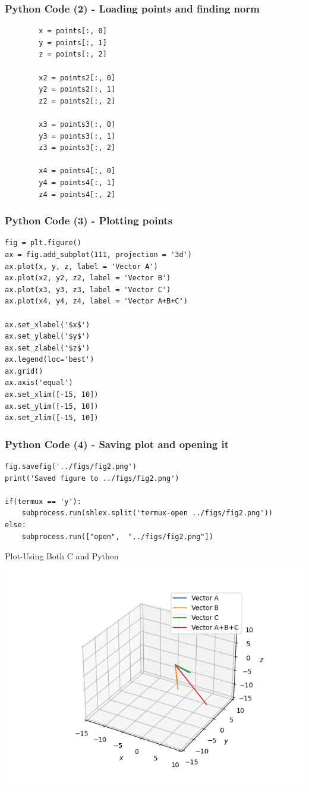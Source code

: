 \documentclass{beamer}
\begin{document}
\begin{frame}[fragile]
    \frametitle{Python Code (2) - Loading points and finding norm}
    \begin{lstlisting}
        x = points[:, 0]
        y = points[:, 1]
        z = points[:, 2]
        
        x2 = points2[:, 0]
        y2 = points2[:, 1]
        z2 = points2[:, 2]
        
        x3 = points3[:, 0]
        y3 = points3[:, 1]
        z3 = points3[:, 2]
        
        x4 = points4[:, 0]
        y4 = points4[:, 1]
        z4 = points4[:, 2]
    \end{lstlisting}
\end{frame}

\begin{frame}[fragile]
    \frametitle{Python Code (3) - Plotting points}
    \begin{lstlisting}
fig = plt.figure()
ax = fig.add_subplot(111, projection = '3d')
ax.plot(x, y, z, label = 'Vector A')
ax.plot(x2, y2, z2, label = 'Vector B')
ax.plot(x3, y3, z3, label = 'Vector C')
ax.plot(x4, y4, z4, label = 'Vector A+B+C')

ax.set_xlabel('$x$')
ax.set_ylabel('$y$')
ax.set_zlabel('$z$')
ax.legend(loc='best')
ax.grid() 
ax.axis('equal')
ax.set_xlim([-15, 10])
ax.set_ylim([-15, 10])
ax.set_zlim([-15, 10])

\end{lstlisting}
\end{frame}

\begin{frame}[fragile]
    \frametitle{Python Code (4) - Saving plot and opening it}
    \begin{lstlisting}
fig.savefig('../figs/fig2.png')
print('Saved figure to ../figs/fig2.png')

if(termux == 'y'):
    subprocess.run(shlex.split('termux-open ../figs/fig2.png'))
else:
    subprocess.run(["open",  "../figs/fig2.png"])
\end{lstlisting}
\end{frame}

\begin{frame}{Plot-Using Both C and Python}
    \centering
    \includegraphics[width=\columnwidth, height=0.8\textheight, keepaspectratio]{../figs/fig2.png}     
\end{frame}
\end{document}
